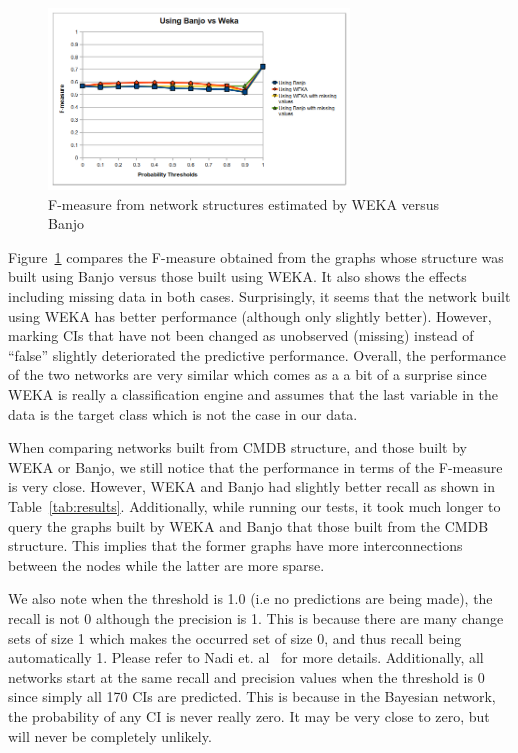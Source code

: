 \documentclass[10pt,twocolumn,letterpaper]{article}
\begin{document}
\begin{figure}[!t]
\centering
\includegraphics[width=8cm]{graphics/banjowekares.png}
\caption{F-measure from network structures estimated by WEKA versus Banjo}
\label{fig:wekabnj}
\end{figure}

Figure~\ref{fig:wekabnj} compares the F-measure obtained from the graphs whose structure was built using Banjo versus those built using WEKA. It also shows the
effects including missing data in both cases. Surprisingly, it seems that the network built using WEKA has better performance (although only slightly better).
However, marking CIs that have not been changed as unobserved (missing) instead of ``false'' slightly deteriorated the predictive performance. Overall, the
performance of the two networks are very similar which comes as a a bit of a surprise since WEKA is really a classification engine and assumes that the last
variable in the data is the target class which is not the case in our data.

When comparing networks built from CMDB structure, and those built by WEKA or Banjo, we still notice that the performance in terms of the F-measure is very
close. However, WEKA and Banjo had slightly better recall as shown in Table~\ref{tab:results}. Additionally, while running our tests, it took much longer to
query the graphs built by WEKA and Banjo that those built from the CMDB structure. This implies that the former graphs have more interconnections between the
nodes while the latter are more sparse.

We also note when the threshold is 1.0 (i.e no predictions are being made), the recall is not 0 although the precision is 1. This is because there are many
change sets of size 1 which makes the occurred set of size 0, and thus recall being automatically 1. Please refer to Nadi et. al~\cite{nadi2010} for more
details. Additionally, all networks start at the same recall and precision values when the threshold is 0 since simply all 170 CIs are predicted. This is
because in the Bayesian network, the probability of any CI is never really zero. It may be very close to zero, but will never be completely unlikely.
\end{document}
